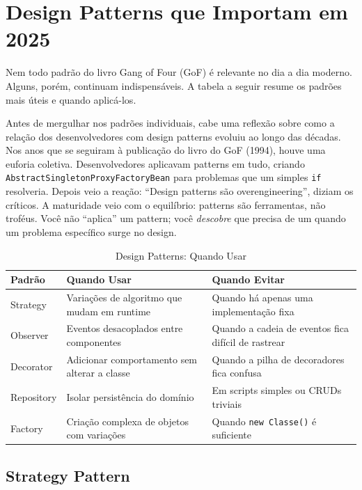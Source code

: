 \section{Design Patterns que Importam em 2025}

Nem todo padrão do livro Gang of Four (GoF) é relevante no dia a dia moderno.
Alguns, porém, continuam indispensáveis. A tabela a seguir resume os padrões
mais úteis e quando aplicá-los.

Antes de mergulhar nos padrões individuais, cabe uma reflexão sobre como a relação
dos desenvolvedores com design patterns evoluiu ao longo das décadas. Nos anos
que se seguiram à publicação do livro do GoF (1994), houve uma euforia coletiva.
Desenvolvedores aplicavam patterns em tudo, criando \texttt{AbstractSingletonProxyFactoryBean}
para problemas que um simples \texttt{if} resolveria. Depois veio a reação:
``Design patterns são overengineering'', diziam os críticos. A maturidade veio
com o equilíbrio: patterns são ferramentas, não troféus. Você não ``aplica''
um pattern; você \emph{descobre} que precisa de um quando um problema
específico surge no design.

\begin{table}[h!]
\centering
\caption{Design Patterns: Quando Usar}
\begin{tabular}{p{3cm} p{5cm} p{5cm}}
\toprule
\textbf{Padrão} & \textbf{Quando Usar} & \textbf{Quando Evitar} \\
\midrule
Strategy & Variações de algoritmo que mudam em runtime & Quando há apenas uma implementação fixa \\
Observer & Eventos desacoplados entre componentes & Quando a cadeia de eventos fica difícil de rastrear \\
Decorator & Adicionar comportamento sem alterar a classe & Quando a pilha de decoradores fica confusa \\
Repository & Isolar persistência do domínio & Em scripts simples ou CRUDs triviais \\
Factory & Criação complexa de objetos com variações & Quando \texttt{new Classe()} é suficiente \\
\bottomrule
\end{tabular}
\end{table}

\subsection{Strategy Pattern}

